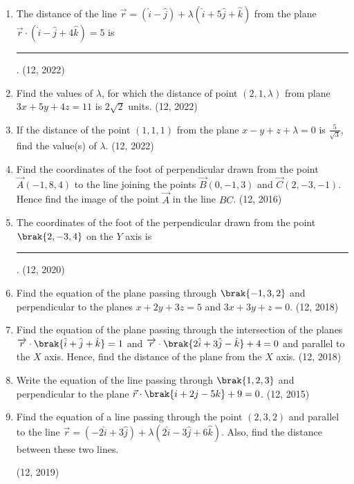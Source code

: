 \begin{enumerate}[label=\thesubsection.\arabic*, ref=\thesubsection.\theenumi]
\item The distance of the line
	$	\vec{r}=(\hat{i}-\hat{j})+\lambda(\hat{i}+5\hat{j}+\hat{k})$
	from the plane
		$\vec{r}\cdot(\hat{i}-\hat{j}+4\hat{k})=5$
	is
\rule{1cm}{0.1pt}.
\hfill (12, 2022)

\item Find the values of $\lambda$, for which the distance of point $(2,1,\lambda)$ from plane $3x+5y+4z=11$ is $2\sqrt{2}$ units. \hfill (12, 2022)
\item If the distance of the point $(1,1,1)$ from the plane $x-y+z+\lambda=0$ is $\frac{5}{\sqrt{3}}$, find the value(s) of $\lambda$. \hfill (12, 2022)
\item Find the coordinates of the foot of perpendicular drawn from the point
      $\vec{A}(-1, 8, 4)$ to the line joining the points $\vec{B}(0, -1, 3)$ and $\vec{C}(2,-3,-1)$. Hence
      find the image of the point $\vec{A}$ in the line $BC$. \hfill (12, 2016)
\item The coordinates of the foot of the perpendicular drawn from the point $\brak{2,-3,4}$ on the $Y$ axis is
\rule{1cm}{0.1pt}.
\hfill (12, 2020)
\item Find the equation of the plane passing through $\brak{-1,3,2}$ and perpendicular to the planes $x+2y+3z=5$ and $3x+3y+z=0$.
\hfill (12, 2018)
\item Find the equation of the plane passing through the intersection of the planes 
$	\overrightarrow{{r}} \cdot \brak{\hat{i} + \hat{j} + \hat{k}} = 1$
and 
$	\overrightarrow{{r}} \cdot \brak{2\hat{i} + 3\hat{j} - \hat{k} } + 4 = 0$
and parallel to the $X$ axis. Hence, find the distance of the plane from the $X$ axis.
\hfill (12, 2018)
\item Write the equation of the line passing through $\brak{1,2,3}$ and perpendicular to the plane $\vec{r}\cdot\brak{{i}+2{j}-5{k}}+9=0$. \hfill (12, 2015)
	\item Find the  equation of a line passing through the point $(2, 3, 2)$ and parallel to the line $\overrightarrow{r} = (-2\hat{i} + 3\hat{j}) + \lambda (2\hat{i} - 3\hat{j} + 6\hat{k})$. Also, find the distance between these two lines.

		\hfill (12, 2019)
\end{enumerate}
